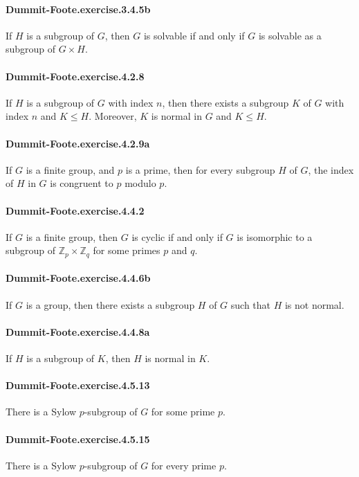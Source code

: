 \documentclass{article}
\begin{document}
\paragraph{Dummit-Foote.exercise.3.4.5b} If $H$ is a subgroup of $G$, then $G$ is solvable if and only if $G$ is solvable as a subgroup of $G \times H$.

\paragraph{Dummit-Foote.exercise.4.2.8} If $H$ is a subgroup of $G$ with index $n$, then there exists a subgroup $K$ of $G$ with index $n$ and $K \leq H$. Moreover, $K$ is normal in $G$ and $K \leq H$.

\paragraph{Dummit-Foote.exercise.4.2.9a} If $G$ is a finite group, and $p$ is a prime, then for every subgroup $H$ of $G$, the index of $H$ in $G$ is congruent to $p$ modulo $p$. 

\paragraph{Dummit-Foote.exercise.4.4.2} If $G$ is a finite group, then $G$ is cyclic if and only if $G$ is isomorphic to a subgroup of $\mathbb{Z}_p\times\mathbb{Z}_q$ for some primes $p$ and $q$.

\paragraph{Dummit-Foote.exercise.4.4.6b} If $G$ is a group, then there exists a subgroup $H$ of $G$ such that $H$ is not normal.

\paragraph{Dummit-Foote.exercise.4.4.8a} If $H$ is a subgroup of $K$, then $H$ is normal in $K$.

\paragraph{Dummit-Foote.exercise.4.5.13} There is a Sylow $p$-subgroup of $G$ for some prime $p$.

\paragraph{Dummit-Foote.exercise.4.5.15} There is a Sylow $p$-subgroup of $G$ for every prime $p$.
\end{document}
